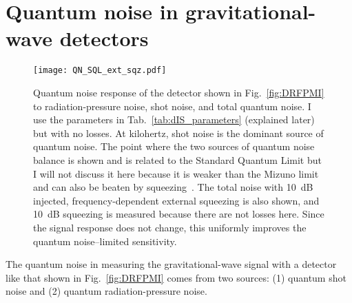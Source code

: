 

\section{Quantum noise in gravitational-wave detectors}
\label{sec:qnoise_GW_IFO}


\begin{figure}[ht]
	\centering
	\texttt{[image: QN\_SQL\_ext\_sqz.pdf]}
	\caption{ Quantum noise response of the detector shown in Fig.~\ref{fig:DRFPMI} to radiation-pressure noise, shot noise, and total quantum noise. I use the parameters in Tab.~\ref{tab:dIS_parameters} (explained later) but with no losses. At kilohertz, shot noise is the dominant source of quantum noise. The point where the two sources of quantum noise balance is shown and is related to the Standard Quantum Limit but I will not discuss it here because it is weaker than the Mizuno limit and can also be beaten by squeezing~\cite{}.
	The total noise with 10~dB injected, frequency-dependent external squeezing is also shown, and 10~dB squeezing is measured because there are not losses here. Since the signal response does not change, this uniformly improves the quantum noise--limited sensitivity.	
	} %
	\label{fig:simplifed_QN_response_conventional}
\end{figure}

The quantum noise in measuring the gravitational-wave signal with a detector like that shown in Fig.~\ref{fig:DRFPMI} comes from two sources: (1) quantum shot noise and (2) quantum radiation-pressure noise.

